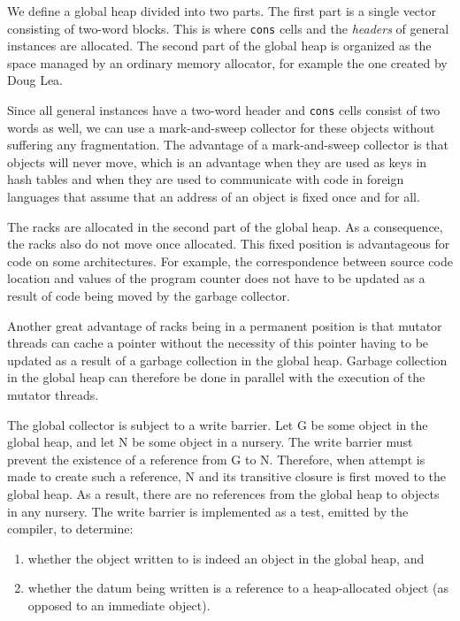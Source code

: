 We define a global heap divided into two parts.  The first part is a
single vector consisting of two-word blocks.  This is where
\texttt{cons} cells and the \emph{headers} of general instances are
allocated.  The second part of the global heap is organized as the
space managed by an ordinary memory allocator, for example the one
created by Doug Lea.

Since all general instances have a two-word header and \texttt{cons}
cells consist of two words as well, we can use a mark-and-sweep
collector for these objects without suffering any fragmentation.  The
advantage of a mark-and-sweep collector is that objects will never
move, which is an advantage when they are used as keys in hash tables
and when they are used to communicate with code in foreign languages
that assume that an address of an object is fixed once and for all.

The racks are allocated in the second part of the global heap.  As a
consequence, the racks also do not move once allocated.  This
fixed position is advantageous for code on some architectures.  For
example, the correspondence between source code location and values of
the program counter does not have to be updated as a result of code
being moved by the garbage collector.

Another great advantage of racks being in a permanent position is that
mutator threads can cache a pointer without the necessity of this
pointer having to be updated as a result of a garbage collection in
the global heap.  Garbage collection in the global heap can therefore
be done in parallel with the execution of the mutator threads.

The global collector is subject to a write barrier.  Let G be some
object in the global heap, and let N be some object in a nursery.  The
write barrier must prevent the existence of a reference from G to N.
Therefore, when attempt is made to create such a reference, N and its
transitive closure is first moved to the global heap.  As a result,
there are no references from the global heap to objects in any
nursery.  The write barrier is implemented as a test, emitted by the
compiler, to determine:

\begin{enumerate}
\item whether the object written to is indeed an object in the global
  heap, and
\item whether the datum being written is a reference to a
  heap-allocated object (as opposed to an immediate object).
\end{enumerate}

